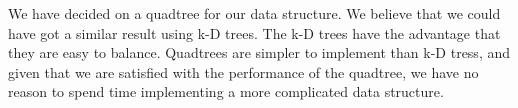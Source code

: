 We have decided on a quadtree for our data structure. We believe that we could have got a similar result using k-D trees. The k-D trees have the advantage that they are easy to balance. Quadtrees are simpler to implement than k-D tress, and given that we are satisfied with the performance of the quadtree, we have no reason to spend time implementing a more complicated data structure.